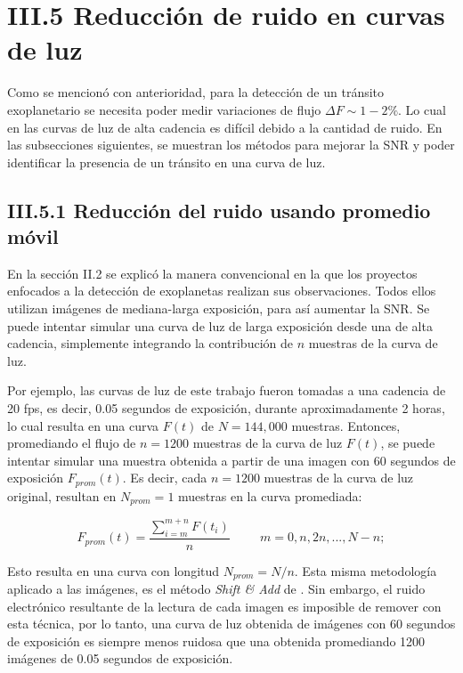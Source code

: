 \section*{III.5 Reducción de ruido en curvas de luz}

Como se mencionó con anterioridad, para la detección de un tránsito exoplanetario se necesita poder medir variaciones de flujo $\Delta F \sim 1-2\%$. Lo cual en las curvas de luz de alta cadencia es difícil debido a la cantidad de ruido. En las subsecciones siguientes, se muestran los métodos para mejorar la SNR y poder identificar la presencia de un tránsito en una curva de luz.

\subsection*{III.5.1 Reducción del ruido usando promedio móvil}

En la sección II.2 se explicó la manera convencional en la que los proyectos enfocados a la detección de exoplanetas realizan sus observaciones. Todos ellos utilizan imágenes de mediana-larga exposición, para así aumentar la SNR. Se puede intentar simular una curva de luz de larga exposición desde una de alta cadencia, simplemente integrando la contribución de $n$ muestras de la curva de luz. 

Por ejemplo, las curvas de luz de este trabajo fueron tomadas a una cadencia de 20 fps, es decir, 0.05 segundos de exposición, durante aproximadamente 2 horas, lo cual resulta en una curva $F(t)$ de $N=144,000$ muestras. Entonces, promediando el flujo de $n=1200$ muestras de la curva de luz $F(t)$, se puede intentar simular una muestra obtenida a partir de una imagen con 60 segundos de exposición $F_{prom}(t)$. Es decir, cada $n=1200$ muestras de la curva de luz original, resultan en $N_{prom}=1$ muestras en la curva promediada:

\begin{equation}
  \displaystyle F_{prom}(t)=  \dfrac{\sum\limits_{i=m}^{m+n} F(t_{i})}{n}\hspace{1cm}m=0,n,2n,...,N-n;
\end{equation}

Esto resulta en una curva con longitud $N_{prom}=N/n$. Esta misma metodología aplicado a las imágenes, es el método \textit{Shift \& Add} de \cite{kluckers1996comparison}. Sin embargo, el ruido electrónico resultante de la lectura de cada imagen es imposible de remover con esta técnica, por lo tanto, una curva de luz obtenida de imágenes con 60 segundos de exposición es siempre menos ruidosa que una obtenida promediando 1200 imágenes de 0.05 segundos de exposición.

